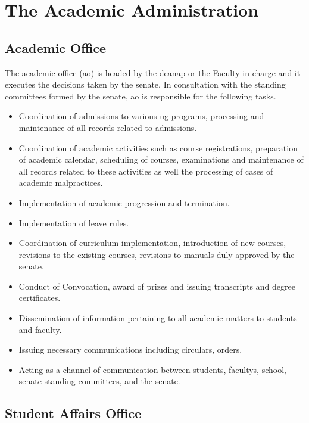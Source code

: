 \section{The Academic Administration}

\subsection{Academic Office}

The academic office (\acrshort{ao}) is headed by the \acrfull{deanap} or the Faculty-in-charge and it executes the decisions taken by the senate. In consultation with the standing committees formed by the \Gls{senate}, \acrshort{ao} is responsible for the following tasks.

\begin{itemize}[leftmargin=15mm]
	\item Coordination of admissions to various \acrshort{ug} programs, processing and maintenance of all records related to admissions.
	\item Coordination of academic activities such as course registrations, preparation of academic calendar, scheduling of courses, examinations and maintenance of all records related to these activities as well the processing of cases of academic malpractices.
	\item Implementation of academic progression and termination.
	\item Implementation of leave rules.
	\item Coordination of curriculum implementation, introduction of new courses, revisions to the existing courses, revisions to manuals duly approved by the \gls{senate}.
	\item Conduct of Convocation, award of prizes and issuing transcripts and degree certificates.
	\item Dissemination of information pertaining to all academic matters to \glspl{student} and faculty.
	\item Issuing necessary communications including circulars, orders. 
	\item Acting as a channel of communication between \glspl{student}, \glspl{faculty}, \gls{school}, senate standing committees, and the \gls{senate}.
\end{itemize}

\subsection{Student Affairs Office}

